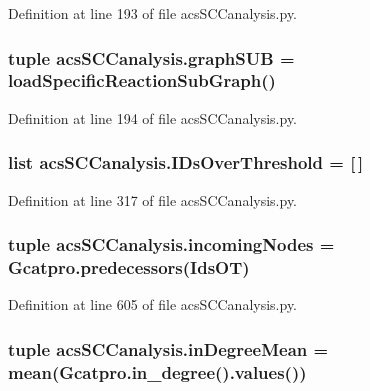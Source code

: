 Definition at line 193 of file acs\-S\-C\-Canalysis.\-py.

\hypertarget{a00096_ae307841da4a073fad4f6eaa172b0b970}{
\subsubsection[{graph\-S\-U\-B}]{\setlength{\rightskip}{0pt plus 5cm}tuple acs\-S\-C\-Canalysis.\-graph\-S\-U\-B = {\bf load\-Specific\-Reaction\-Sub\-Graph}()}}\label{a00096_ae307841da4a073fad4f6eaa172b0b970}


Definition at line 194 of file acs\-S\-C\-Canalysis.\-py.

\hypertarget{a00096_a578f0f0f1e87579d73b11f8720610b1e}{
\subsubsection[{I\-Ds\-Over\-Threshold}]{\setlength{\rightskip}{0pt plus 5cm}list acs\-S\-C\-Canalysis.\-I\-Ds\-Over\-Threshold = \mbox{[}$\,$\mbox{]}}}\label{a00096_a578f0f0f1e87579d73b11f8720610b1e}


Definition at line 317 of file acs\-S\-C\-Canalysis.\-py.

\hypertarget{a00096_a540ba5319ee67d8a2323099dad73ba36}{
\subsubsection[{incoming\-Nodes}]{\setlength{\rightskip}{0pt plus 5cm}tuple acs\-S\-C\-Canalysis.\-incoming\-Nodes = Gcatpro.\-predecessors(Ids\-O\-T)}}\label{a00096_a540ba5319ee67d8a2323099dad73ba36}


Definition at line 605 of file acs\-S\-C\-Canalysis.\-py.

\hypertarget{a00096_a5004d18b8cfa2803620a9cd7f32d9775}{
\subsubsection[{in\-Degree\-Mean}]{\setlength{\rightskip}{0pt plus 5cm}tuple acs\-S\-C\-Canalysis.\-in\-Degree\-Mean = mean(Gcatpro.\-in\-\_\-degree().values())}}\label{a00096_a5004d18b8cfa2803620a9cd7f32d9775}


